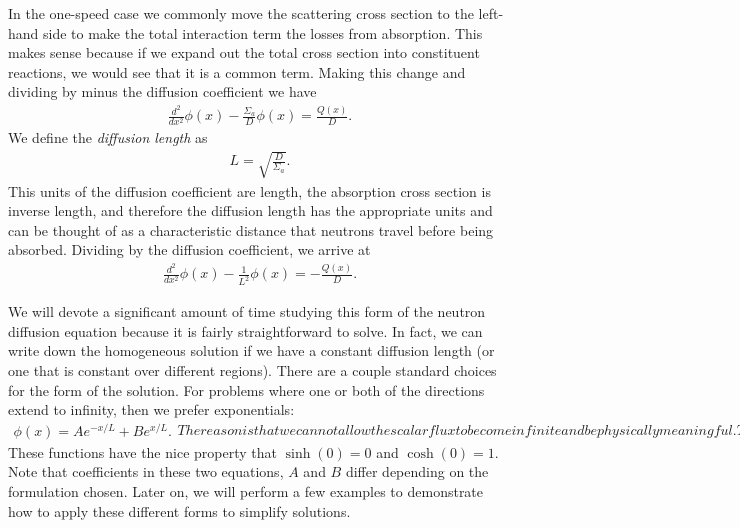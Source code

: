 In the one-speed case we commonly move the scattering cross section to the left-hand side to make the total interaction term the losses from absorption. This makes sense because if we expand out the total cross section into constituent reactions, we would see that it is a common term. Making this change and dividing by minus the diffusion coefficient we have
\begin{align}
  \frac{d^2}{dx^2} \phi(x) - \frac{\Sigma_a}{D} \phi(x) =  \frac{Q(x)}{D}.
\end{align}
We define the \emph{diffusion length} as
\begin{align}
  L = \sqrt{ \frac{D}{\Sigma_a} }.
\end{align}
This units of the diffusion coefficient are length, the absorption cross section is inverse length, and therefore the diffusion length has the appropriate units and can be thought of as a characteristic distance that neutrons travel before being absorbed. Dividing by the diffusion coefficient, we arrive at
\begin{align}
  \frac{d^2}{dx^2} \phi(x) - \frac{1}{L^2} \phi(x) = -\frac{Q(x)}{D}.
\end{align}

We will devote a significant amount of time studying this form of the neutron diffusion equation because it is fairly straightforward to solve. In fact, we can write down the homogeneous solution if we have a constant diffusion length (or one that is constant over different regions). There are a couple standard choices for the form of the solution. For problems where one or both of the directions extend to infinity, then we prefer exponentials:
\begin{subequations}
\begin{align} \label{Eq:neutronics_diffusionHomogeneous_1DPlanarExponential}
  \phi(x) = A e^{-x/L} + B e^{x/L} .
\end{align}
The reason is that we cannot allow the scalar flux to become infinite and be physically meaningful. This allows us to eliminate one of the terms and will simplify algebra going forward. For cases with a finite or bounded region, the hyperbolic trigonometric functions tend to be superior in terms of yielding less tedious algebra. This is
\begin{align} \label{Eq:neutronics_diffusionHomogeneous_1DPlanarHyperbolic}
  \phi(x) = A \sinh(x/L) + B \cosh(x/L).
\end{align}
\end{subequations}
These functions have the nice property that $\sinh(0) = 0$ and $\cosh(0) = 1$. Note that coefficients in these two equations, $A$ and $B$ differ depending on the formulation chosen. Later on, we will perform a few examples to demonstrate how to apply these different forms to simplify solutions.

